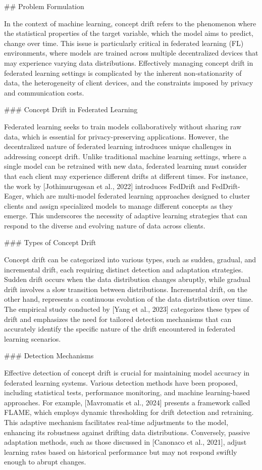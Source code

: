 \documentclass[journal]{IEEEtran}
\begin{document}
\#\# Problem Formulation

In the context of machine learning, concept drift refers to the phenomenon where the statistical properties of the target variable, which the model aims to predict, change over time. This issue is particularly critical in federated learning (FL) environments, where models are trained across multiple decentralized devices that may experience varying data distributions. Effectively managing concept drift in federated learning settings is complicated by the inherent non-stationarity of data, the heterogeneity of client devices, and the constraints imposed by privacy and communication costs.

\#\#\# Concept Drift in Federated Learning

Federated learning seeks to train models collaboratively without sharing raw data, which is essential for privacy-preserving applications. However, the decentralized nature of federated learning introduces unique challenges in addressing concept drift. Unlike traditional machine learning settings, where a single model can be retrained with new data, federated learning must consider that each client may experience different drifts at different times. For instance, the work by [Jothimurugesan et al., 2022] introduces FedDrift and FedDrift-Eager, which are multi-model federated learning approaches designed to cluster clients and assign specialized models to manage different concepts as they emerge. This underscores the necessity of adaptive learning strategies that can respond to the diverse and evolving nature of data across clients.

\#\#\# Types of Concept Drift

Concept drift can be categorized into various types, such as sudden, gradual, and incremental drift, each requiring distinct detection and adaptation strategies. Sudden drift occurs when the data distribution changes abruptly, while gradual drift involves a slow transition between distributions. Incremental drift, on the other hand, represents a continuous evolution of the data distribution over time. The empirical study conducted by [Yang et al., 2023] categorizes these types of drift and emphasizes the need for tailored detection mechanisms that can accurately identify the specific nature of the drift encountered in federated learning scenarios.

\#\#\# Detection Mechanisms

Effective detection of concept drift is crucial for maintaining model accuracy in federated learning systems. Various detection methods have been proposed, including statistical tests, performance monitoring, and machine learning-based approaches. For example, [Mavromatis et al., 2024] presents a framework called FLAME, which employs dynamic thresholding for drift detection and retraining. This adaptive mechanism facilitates real-time adjustments to the model, enhancing its robustness against drifting data distributions. Conversely, passive adaptation methods, such as those discussed in [Canonaco et al., 2021], adjust learning rates based on historical performance but may not respond swiftly enough to abrupt changes.
\end{document}
